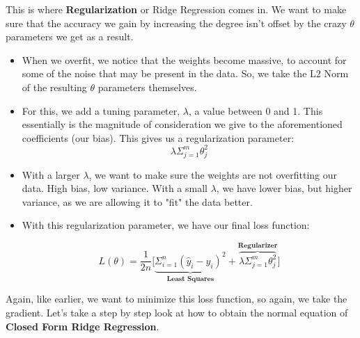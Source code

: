 \documentclass{article}
\begin{document}
This is where \textbf{Regularization} or Ridge Regression comes in. We want to make sure that the accuracy we gain by increasing the degree isn't offset by the crazy $\theta$ parameters we get as a result. 
\begin{itemize}

    \item When we overfit, we notice that the weights become massive, to account for some of the noise that may be present in the data. So, we take the L2 Norm of the resulting $\theta$ parameters themselves.
    
    \item For this, we add a tuning parameter, $\lambda$, a value between 0 and 1. This essentially is the magnitude of consideration we give to the aforementioned coefficients (our bias). This gives us a regularization parameter:
    $$\lambda\Sigma^m_{j=1}\theta_j^2$$
    
    \item With a larger $\lambda$, we want to make sure the weights are not overfitting our data. High bias, low variance. With a small $\lambda$, we have lower bias, but higher variance, as we are allowing it to "fit" the data better.
    
    \item With this regularization parameter, we have our final loss function:
        
        $$L(\theta) = \frac{1}{2n}\bigg[\underbrace{\Sigma^n_{i=1}(\hat{y}_i - y_i)^2}_\textbf{Least Squares} + \overbrace{\lambda\Sigma^m_{j=1}\theta_j^2}^\textbf{Regularizer}\bigg]$$
\end{itemize}
Again, like earlier, we want to minimize this loss function, so again, we take the gradient. Let's take a step by step look at how to obtain the normal equation of \textbf{Closed Form Ridge Regression}. 
\end{document}
